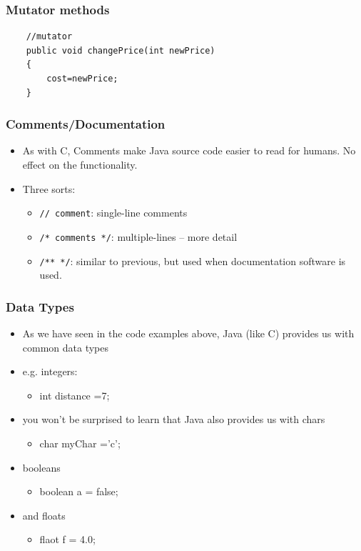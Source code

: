 \documentclass{beamer}
\begin{document}
\begin{frame}[fragile]
\frametitle{Mutator methods}
\begin{lstlisting}
    //mutator
    public void changePrice(int newPrice)
    {
        cost=newPrice;
    } 
\end{lstlisting}
\end{frame}

\begin{frame}
\frametitle{Comments/Documentation}
\begin{itemize}
\item As with C, Comments make Java source code easier to read for humans. No effect on the functionality.
\item Three sorts:
\begin{itemize}
\item \lstinline!// comment!: single-line comments
\item \lstinline!/* comments */!: multiple-lines – more detail
\item \lstinline!/** */!: similar to previous, but used when documentation software is used.
\end{itemize}
\end{itemize}
\end{frame}

\begin{frame}
\frametitle{Data Types}
\begin{itemize}
\item As we have seen in the code examples above, Java (like C) provides us with common data types 
\item e.g. integers: 
\begin{itemize}
\item int distance =7;
\end{itemize}
\item you won't be surprised to learn that Java also provides us with chars
\begin{itemize}
\item char myChar ='c';
\end{itemize}
\item booleans
\begin{itemize}
\item boolean a = false; 
\end{itemize}
\item and floats
\begin{itemize}
\item flaot f = 4.0; 
\end{itemize}
\end{itemize} 
\end{frame}
\end{document}
